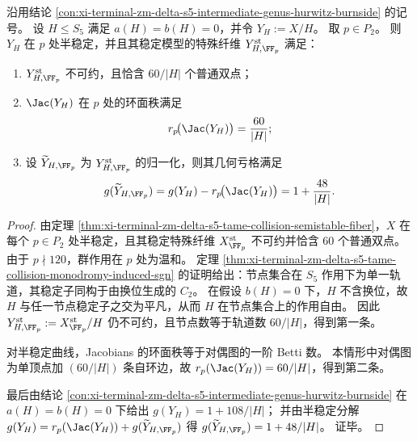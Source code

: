 \begin{proposition}[全不分歧商的节点律与归一化亏格]\label{prop:xi-terminal-zm-delta-s5-tame-collision-etale-quotient-node-law}
沿用结论 \ref{con:xi-terminal-zm-delta-s5-intermediate-genus-hurwitz-burnside} 的记号。
设 \(H\le S_5\) 满足 \(a(H)=b(H)=0\)，并令 \(Y_H:=X/H\)。
取 \(p\in P_2\)。
则 \(Y_H\) 在 \(p\) 处半稳定，并且其稳定模型的特殊纤维 \(Y_{H,\FF_p}^{\mathrm{st}}\) 满足：
\begin{enumerate}
  \item \(Y_{H,\FF_p}^{\mathrm{st}}\) 不可约，且恰含 \(60/|H|\) 个普通双点；
  \item \(\Jac(Y_H)\) 在 \(p\) 处的环面秩满足
  \[
  r_p\!\bigl(\Jac(Y_H)\bigr)=\frac{60}{|H|};
  \]
  \item 设 \(\widetilde Y_{H,\FF_p}\) 为 \(Y_{H,\FF_p}^{\mathrm{st}}\) 的归一化，则其几何亏格满足
  \[
  g(\widetilde Y_{H,\FF_p})
  =g(Y_H)-r_p\!\bigl(\Jac(Y_H)\bigr)
  =1+\frac{48}{|H|}.
  \]
\end{enumerate}
\end{proposition}
\begin{proof}
由定理 \ref{thm:xi-terminal-zm-delta-s5-tame-collision-semistable-fiber}，\(X\) 在每个 \(p\in P_2\) 处半稳定，且其稳定特殊纤维 \(X^{\mathrm{st}}_{\FF_p}\) 不可约并恰含 \(60\) 个普通双点。
由于 \(p\nmid 120\)，群作用在 \(p\) 处为温和。
定理 \ref{thm:xi-terminal-zm-delta-s5-tame-collision-monodromy-induced-sgn} 的证明给出：节点集合在 \(S_5\) 作用下为单一轨道，其稳定子同构于由换位生成的 \(C_2\)。
在假设 \(b(H)=0\) 下，\(H\) 不含换位，故 \(H\) 与任一节点稳定子之交为平凡，从而 \(H\) 在节点集合上的作用自由。
因此 \(Y_{H,\FF_p}^{\mathrm{st}}:=X^{\mathrm{st}}_{\FF_p}/H\) 仍不可约，且节点数等于轨道数 \(60/|H|\)，得到第一条。
\par
对半稳定曲线，Jacobians 的环面秩等于对偶图的一阶 Betti 数。
本情形中对偶图为单顶点加 \((60/|H|)\) 条自环边，故
\(
r_p(\Jac(Y_H))=60/|H|
\)，得到第二条。
\par
最后由结论 \ref{con:xi-terminal-zm-delta-s5-intermediate-genus-hurwitz-burnside} 在 \(a(H)=b(H)=0\) 下给出
\(
g(Y_H)=1+108/|H|
\)；
并由半稳定分解 \(g(Y_H)=r_p(\Jac(Y_H))+g(\widetilde Y_{H,\FF_p})\) 得
\(
g(\widetilde Y_{H,\FF_p})=1+48/|H|
\)。
证毕。
\end{proof}

